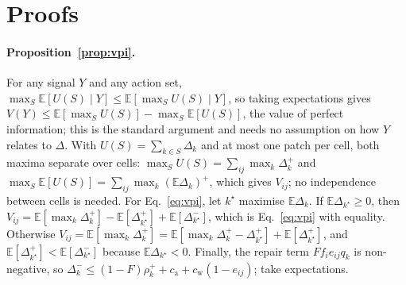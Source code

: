 \documentclass[11pt]{article}
\begin{document}
\begin{table}[t]
\centering
\small
\setlength{\tabcolsep}{2.5pt}
\caption{$\mathrm{Net}(N)$ of each verified set against Apply attributed (Eq.~\ref*{M-eq:net}), at $N=1000$ deployed episodes, with no change cost and a success worth $v$ episodes of running cost. $\Delta p$: held-out difference in points (Table~\ref{tab:deploy}); $\Delta c_{\mathrm{run}}$: estimated change in running cost per deployed episode, from the tokens of patched agents on solved tasks and of truncated step-limit episodes; $C$: verification episodes. Intervals combine the uncertainty of $\Delta p$ and of $\Delta c_{\mathrm{run}}$ (standard error about 0.1), as normal.}
\label{tab:netn}
\end{table}

\section{Proofs}
\label{app:proofs}

\paragraph{Proposition~\ref{prop:vpi}.} For any signal $Y$ and any action set, $\max_S\mathbb E[U(S)\mid Y]\le\mathbb E[\max_S U(S)\mid Y]$, so taking expectations gives $V(Y)\le\mathbb E[\max_S U(S)]-\max_S\mathbb E[U(S)]$, the value of perfect information; this is the standard argument and needs no assumption on how $Y$ relates to $\Delta$. With $U(S)=\sum_{k\in S}\Delta_k$ and at most one patch per cell, both maxima separate over cells: $\max_S U(S)=\sum_{ij}\max_k\Delta_k^+$ and $\max_S\mathbb E[U(S)]=\sum_{ij}\max_k(\mathbb E\Delta_k)^+$, which gives $V_{ij}$; no independence between cells is needed. For Eq.~\ref{eq:vpi}, let $k^\star$ maximise $\mathbb E\Delta_k$. If $\mathbb E\Delta_{k^\star}\ge0$, then $V_{ij}=\mathbb E[\max_k\Delta_k^+]-\mathbb E[\Delta_{k^\star}^+]+\mathbb E[\Delta_{k^\star}^-]$, which is Eq.~\ref{eq:vpi} with equality. Otherwise $V_{ij}=\mathbb E[\max_k\Delta_k^+]=\mathbb E[\max_k\Delta_k^+-\Delta_{k^\star}^+]+\mathbb E[\Delta_{k^\star}^+]$, and $\mathbb E[\Delta_{k^\star}^+]<\mathbb E[\Delta_{k^\star}^-]$ because $\mathbb E\Delta_{k^\star}<0$. Finally, the repair term $Ff_ie_{ij}q_k$ is non-negative, so $\Delta_k^-\le(1-F)\rho_k^++c_{\mathrm a}+c_{\mathrm w}(1-e_{ij})$; take expectations.
\end{document}
